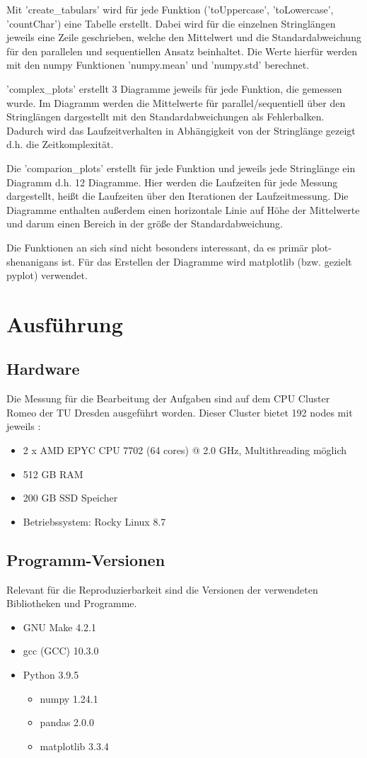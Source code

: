 \documentclass[plainarticle,zihtitle,german,final,hyperref,utf8]{zihpub}
\begin{document}
Mit 'create\_tabulars' wird für jede Funktion ('toUppercase', 'toLowercase', 'countChar') eine Tabelle erstellt. Dabei wird für die einzelnen Stringlängen jeweils eine Zeile geschrieben, welche den Mittelwert und die Standardabweichung für den parallelen und sequentiellen Ansatz beinhaltet. Die Werte hierfür werden mit den numpy Funktionen 'numpy.mean' und 'numpy.std' berechnet.

'complex\_plots' erstellt 3 Diagramme jeweils für jede Funktion, die gemessen wurde. Im Diagramm werden die Mittelwerte für parallel/sequentiell über den Stringlängen dargestellt mit den Standardabweichungen als Fehlerbalken. Dadurch wird das Laufzeitverhalten in Abhängigkeit von der Stringlänge gezeigt d.h. die Zeitkomplexität.

Die 'comparion\_plots' erstellt für jede Funktion und jeweils jede Stringlänge ein Diagramm d.h. 12 Diagramme.
Hier werden die Laufzeiten für jede Messung dargestellt, heißt die Laufzeiten über den Iterationen der Laufzeitmessung. Die Diagramme enthalten außerdem einen horizontale Linie auf Höhe der Mittelwerte und darum einen Bereich in der größe der Standardabweichung.

Die Funktionen an sich sind nicht besonders interessant, da es primär plot-shenanigans ist. Für das Erstellen der Diagramme wird matplotlib (bzw. gezielt pyplot) verwendet.

\section{Ausführung}
\subsection{Hardware}
Die Messung für die Bearbeitung der Aufgaben sind auf dem CPU Cluster Romeo der TU Dresden ausgeführt worden. Dieser Cluster bietet 192 nodes mit jeweils \cite{hpc_compendium}:
\begin{itemize}
\item 2 x AMD EPYC CPU 7702 (64 cores) @ 2.0 GHz, Multithreading möglich
\item 512 GB RAM
\item 200 GB SSD Speicher
\item Betriebssystem: Rocky Linux 8.7
\end{itemize}


\subsection{Programm-Versionen}
Relevant für die Reproduzierbarkeit sind die Versionen der verwendeten Bibliotheken und Programme.
\begin{itemize}
	\item GNU Make 4.2.1
	\item gcc (GCC) 10.3.0
	\item Python 3.9.5
	\begin{itemize}
		\item numpy 1.24.1
		\item pandas 2.0.0
		\item matplotlib 3.3.4
	\end{itemize}
\end{itemize}
\end{document}
